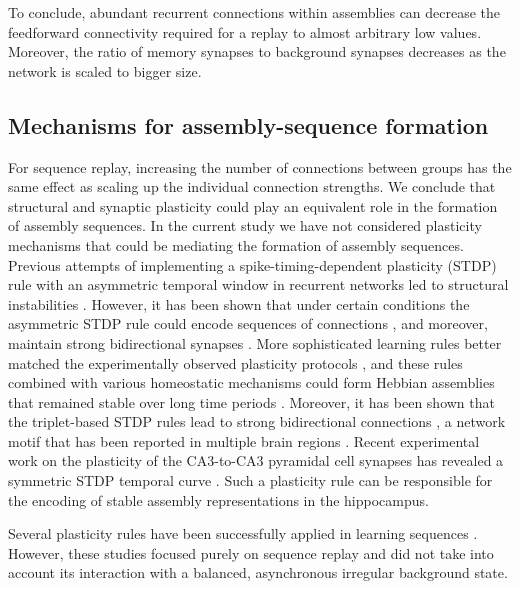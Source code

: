     To conclude, abundant recurrent connections within assemblies can decrease
    the feedforward connectivity required for a replay to almost arbitrary low
    values. Moreover, the ratio of memory synapses to background synapses
    decreases as the network is scaled to bigger size.

  \subsection{Mechanisms for assembly-sequence formation}
    For sequence replay, increasing the number of connections between groups
    has the same effect as scaling up the individual connection strengths. We
    conclude that structural and synaptic plasticity could play an equivalent
    role in the formation of assembly sequences. In the current study we have
    not considered plasticity mechanisms that could be mediating the formation
    of assembly sequences. Previous attempts of implementing a
    spike-timing-dependent plasticity (STDP) rule with an asymmetric temporal
    window \citep{Bi1998, Gerstner1996, Kempter1999} in recurrent networks led to
    structural instabilities \citep{Horn2000, Morrison2007, Lazar2009}. However,
    it has been shown that under certain conditions the asymmetric STDP rule
    could encode sequences of connections \citep{Jahnke2015}, and moreover,
    maintain strong bidirectional synapses \citep{Bush2010}. More sophisticated
    learning rules better matched the experimentally observed plasticity
    protocols \citep{Pfister2006, Clopath2010, Graupner2012}, and these rules
    combined with various homeostatic mechanisms could form Hebbian assemblies
    that remained stable over long time periods \citep{Litwin2014,
    Sadeh2015, Zenke2015}. Moreover, it has been shown that the triplet-based
    STDP rules \citep{Pfister2006, Clopath2010} lead to strong bidirectional
    connections \citep{Litwin2014, Sadeh2015}, a network motif that has
    been reported in multiple brain regions \citep{Song2005, Ko2011,
    Sadovsky2013, Cossell2015, Guzman2016}. Recent experimental work on the
    plasticity of the CA3-to-CA3 pyramidal cell synapses has revealed a
    symmetric STDP temporal curve \citep{Mishra2016}. Such a plasticity rule can
    be responsible for the encoding of stable assembly representations in the
    hippocampus.

    Several plasticity rules have been successfully applied in learning
    sequences \citep{Bush2010, Waddington2012, Brea2013, Kruskal2013,
    Rezende2014, Scarpetta2014, Jahnke2015}. However, these studies focused
    purely on sequence replay and did not take into account its interaction
    with a balanced, asynchronous irregular background state.

